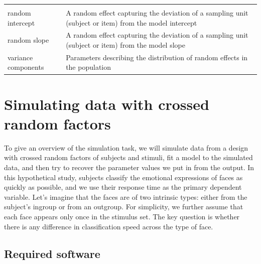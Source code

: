 \documentclass[doc,floatsintext]{apa6}
\begin{document}
\begin{tcolorbox}[colback=black!5!white,colframe=white!5!black,title=Box 1. Glossary of terms]
\begin{longtable}[]{@{}ll@{}}
\begin{minipage}[t]{0.65\columnwidth}
\end{minipage}\tabularnewline
\begin{minipage}[t]{0.29\columnwidth}\raggedright
random intercept\strut
\end{minipage} & \begin{minipage}[t]{0.65\columnwidth}\raggedright
A random effect capturing the deviation of a sampling unit (subject or item) from the model intercept\strut
\end{minipage}\tabularnewline
\begin{minipage}[t]{0.29\columnwidth}\raggedright
random slope\strut
\end{minipage} & \begin{minipage}[t]{0.65\columnwidth}\raggedright
A random effect capturing the deviation of a sampling unit (subject or item) from the model slope\strut
\end{minipage}\tabularnewline
\begin{minipage}[t]{0.29\columnwidth}\raggedright
variance components\strut
\end{minipage} & \begin{minipage}[t]{0.65\columnwidth}\raggedright
Parameters describing the distribution of random effects in the
population\strut
\end{minipage}\tabularnewline
\end{longtable}
\end{tcolorbox}

\section{Simulating data with crossed random
factors}\label{simulating-data-with-crossed-random-factors}

To give an overview of the simulation task, we will simulate data from a
design with crossed random factors of subjects and stimuli, fit a model
to the simulated data, and then try to recover the parameter values we
put in from the output. In this hypothetical study, subjects classify
the emotional expressions of faces as quickly as possible, and we use
their response time as the primary dependent variable. Let's imagine
that the faces are of two intrinsic types: either from the subject's
ingroup or from an outgroup. For simplicity, we further assume that each
face appears only once in the stimulus set. The key question is whether
there is any difference in classification speed across the type of face.

\subsection{Required software}\label{required-software}
\end{document}
